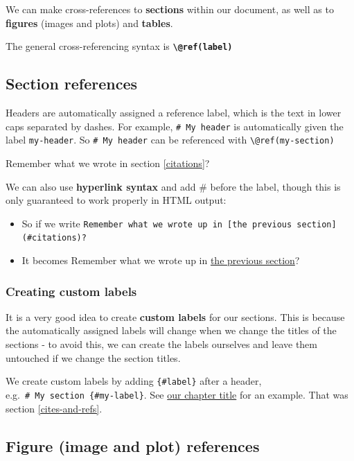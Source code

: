 \documentclass[a4paper, twoside]{templates/ociamthesis}
\providecommand{\tightlist}{%
  \setlength{\itemsep}{0pt}\setlength{\parskip}{0pt}}
\begin{document}
We can make cross-references to \textbf{sections} within our document, as well as to \textbf{figures} (images and plots) and \textbf{tables}.

The general cross-referencing syntax is \textbf{\texttt{\textbackslash{}@ref(label)}}

\hypertarget{section-references}{%
\subsection{Section references}\label{section-references}}

Headers are automatically assigned a reference label, which is the text in lower caps separated by dashes. For example, \texttt{\#\ My\ header} is automatically given the label \texttt{my-header}. So \texttt{\#\ My\ header} can be referenced with \texttt{\textbackslash{}@ref(my-section)}

Remember what we wrote in section \ref{citations}?

We can also use \textbf{hyperlink syntax} and add \# before the label, though this is only guaranteed to work properly in HTML output:

\begin{itemize}
\tightlist
\item
  So if we write \texttt{Remember\ what\ we\ wrote\ up\ in\ {[}the\ previous\ section{]}(\#citations)?}
\item
  It becomes Remember what we wrote up in \protect\hyperlink{citations}{the previous section}?
\end{itemize}

\hypertarget{creating-custom-labels}{%
\subsubsection{Creating custom labels}\label{creating-custom-labels}}

It is a very good idea to create \textbf{custom labels} for our sections. This is because the automatically assigned labels will change when we change the titles of the sections - to avoid this, we can create the labels ourselves and leave them untouched if we change the section titles.

We create custom labels by adding \texttt{\{\#label\}} after a header, e.g.~\texttt{\#\ My\ section\ \{\#my-label\}}.
See \protect\hyperlink{cites-and-refs}{our chapter title} for an example. That was section \ref{cites-and-refs}.

\hypertarget{figure-image-and-plot-references}{%
\subsection{Figure (image and plot) references}\label{figure-image-and-plot-references}}
\end{document}
